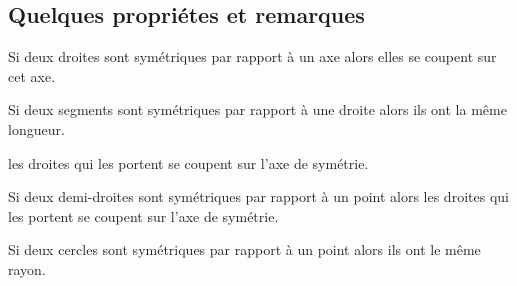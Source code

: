     \subsection{Quelques propriétes et remarques}
    \begin{propriete}[\admise]
        Si deux droites sont symétriques par rapport à un axe alors elles se coupent sur cet axe.
    \end{propriete}
    \begin{propriete}[\admise]
        Si deux segments sont symétriques par rapport à une droite alors ils ont la même longueur.
    \end{propriete}
    \begin{remarque}
        les droites qui les portent se coupent sur l'axe de symétrie.
    \end{remarque}
    \begin{propriete}[\admise]
        Si deux demi-droites sont symétriques par rapport à un point alors les droites qui les portent se coupent sur l'axe de symétrie.
    \end{propriete}
    \begin{propriete}[\admise]
        Si deux cercles sont symétriques par rapport à un point alors ils ont le même rayon.
    \end{propriete}

    
     
        
